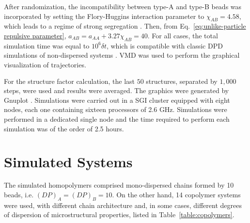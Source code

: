 \documentclass[
aip,
jcp,
reprint,
]{revtex4-1}
\begin{document}
After randomization, the incompatibility between type-A and type-B beads was incorporated by setting the Flory-Huggins interaction parameter to $\chi_{AB} = 4.58$, which leads to a regime of strong segregation \cite{Hamley_1998}.
Then, from Eq.~\eqref{eq:unlike-particle repulsive parameter}, $a_{AB} = a_{AA} + 3.27 \chi_{AB} = 40$.
For all cases, the total simulation time was equal to $10^6 \delta t$, which is compatible with classic DPD simulations of non-dispersed systems \cite{Groot_1998}.
VMD \cite{Humphrey_1996} was used to perform the graphical visualization of trajectories.

For the structure factor calculation, the last $50$ structures, separated by $1,000$ steps, were used and results were averaged.
The graphics were generated by Gnuplot \cite{Williams_2013}.
Simulations were carried out in a SGI cluster equipped with eight nodes, each one containing sixteen processors of 2.6 GHz.
Simulations were performed in a dedicated single node and the time required to perform each simulation was of the order of 2.5 hours.

\section{Simulated Systems}
\label{sec:simulated systems}

The simulated homopolymers comprised mono-dispersed chains formed by 10 beads, i.e. $(DP)_A = (DP)_B = 10$.
On the other hand, 14 copolymer systems were used, with different chain architecture and, in some cases, different degrees  of dispersion of microstructural properties, listed in Table~\ref{table:copolymers}. 
\end{document}
